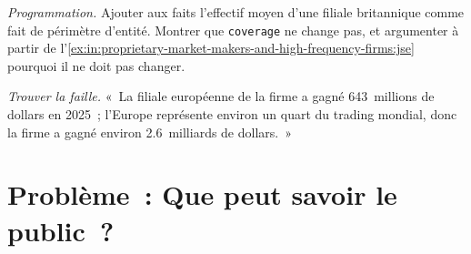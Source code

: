 \begin{exercise}[$\star\star\star$]\label{exo:in:proprietary-market-makers-and-high-frequency-firms:7}
\emph{Programmation.} Ajouter aux faits l'effectif moyen d'une filiale britannique comme fait de périmètre d'entité. Montrer que
\texttt{coverage} ne change pas, et argumenter à partir de l'\cref{ex:in:proprietary-market-makers-and-high-frequency-firms:jse} pourquoi
il ne doit pas changer.
\end{exercise}

\begin{exercise}[$\star\star\star$]\label{exo:in:proprietary-market-makers-and-high-frequency-firms:8}
\emph{Trouver la faille.} «~La filiale européenne de la firme a gagné 643~millions de dollars en 2025~; l'Europe représente environ un quart du
trading mondial, donc la firme a gagné environ 2.6~milliards de dollars.~»
\end{exercise}

\section{Problème~: Que peut savoir le public~?}

